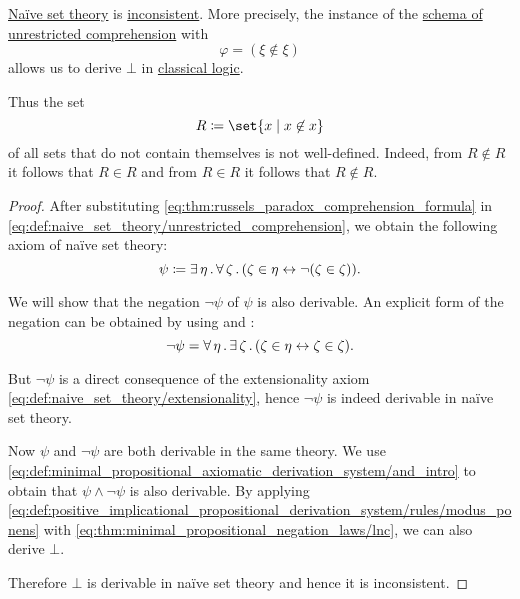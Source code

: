 \begin{theorem}\label{thm:russels_paradox}
  \hyperref[def:naive_set_theory]{Na\"ive set theory} is \hyperref[def:first_order_theory/consistent]{inconsistent}. More precisely, the instance of the \hyperref[def:naive_set_theory/unrestricted_comprehension]{schema of unrestricted comprehension} with
  \begin{equation}\label{eq:thm:russels_paradox_comprehension_formula}
    \varphi = (\xi \not\in \xi)
  \end{equation}
  allows us to derive \( \bot \) in \hyperref[def:classical_logic]{classical logic}.

  Thus the set
  \begin{equation}\label{eq:thm:russels_paradox_set}
    R \coloneqq \set{ x \given x \not\in x }
  \end{equation}
  of all sets that do not contain themselves is not well-defined. Indeed, from \( R \not\in R \) it follows that \( R \in R \) and from \( R \in R \) it follows that \( R \not\in R \).
\end{theorem}
\begin{proof}
  After substituting \eqref{eq:thm:russels_paradox_comprehension_formula} in \eqref{eq:def:naive_set_theory/unrestricted_comprehension}, we obtain the following axiom of na\"ive set theory:
  \begin{equation}\label{eq:thm:russels_paradox_comprehension_axiom}
    \psi \coloneqq \exists \thinspace \eta \thinspace . \thinspace \forall \thinspace \zeta \thinspace . \thinspace (\zeta \in \eta \leftrightarrow \neg (\zeta \in \zeta)).
  \end{equation}

  We will show that the negation \( \neg\psi \) of \( \psi \) is also derivable. An explicit form of the negation can be obtained by using  and :
  \begin{equation*}
    \neg\psi = \forall \thinspace \eta \thinspace . \thinspace \exists \thinspace \zeta \thinspace . \thinspace (\zeta \in \eta \leftrightarrow \zeta \in \zeta).
  \end{equation*}

  But \( \neg\psi \) is a direct consequence of the extensionality axiom \eqref{eq:def:naive_set_theory/extensionality}, hence \( \neg\psi \) is indeed derivable in na\"ive set theory.

  Now \( \psi \) and \( \neg\psi \) are both derivable in the same theory. We use \eqref{eq:def:minimal_propositional_axiomatic_derivation_system/and_intro} to obtain that \( \psi \wedge \neg\psi \) is also derivable. By applying \eqref{eq:def:positive_implicational_propositional_derivation_system/rules/modus_ponens} with \eqref{eq:thm:minimal_propositional_negation_laws/lnc}, we can also derive \( \bot \).

  Therefore \( \bot \) is derivable in na\"ive set theory and hence it is inconsistent.
\end{proof}

